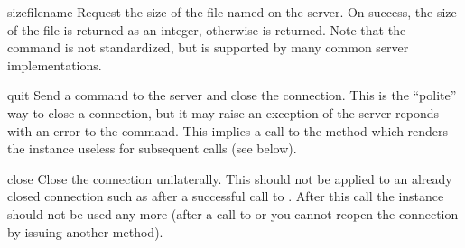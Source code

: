 \begin{methoddesc}[FTP]{size}{filename}
Request the size of the file named  on the server.  On
success, the size of the file is returned as an integer, otherwise
 is returned.  Note that the  command is not 
standardized, but is supported by many common server implementations.
\end{methoddesc}

\begin{methoddesc}[FTP]{quit}{}
Send a  command to the server and close the connection.
This is the ``polite'' way to close a connection, but it may raise an
exception of the server reponds with an error to the
 command.  This implies a call to the 
method which renders the  instance useless for subsequent
calls (see below).
\end{methoddesc}

\begin{methoddesc}[FTP]{close}{}
Close the connection unilaterally.  This should not be applied to an
already closed connection such as after a successful call to
.  After this call the  instance should not
be used any more (after a call to  or
 you cannot reopen the connection by issuing another
 method).
\end{methoddesc}
